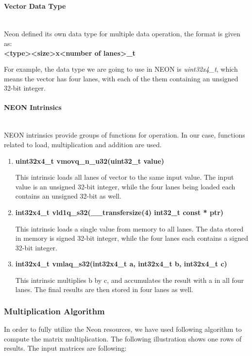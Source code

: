 \paragraph{Vector Data Type}
~\\
Neon defined its own data type\cite{DataType} for multiple data operation, the format is given as:
~\\ 
\textbf{ \textless type\textgreater \textless size\textgreater x\textless number of lanes\textgreater\_t}

For example, the data type we are going to use in NEON is \emph{uint32x4\_t}, 
which means the vector has four lanes, 
with each of the them containing an unsigned 32-bit integer. 

\paragraph{NEON Intrinsics}
~\\
NEON intrinsics \cite{Intrinsics} provide groups of functions for operation. 
In our case, functions related to load, multiplication and addition are used. 
\begin{enumerate}
\item \textbf{uint32x4\_t  vmovq\_n\_u32(uint32\_t value)}

This intrinsic loads all lanes of vector to the same input value. 
The input value is an unsigned 32-bit integer, 
while the four lanes being loaded each contains an unsigned 32-bit as well.


\item \textbf{int32x4\_t   vld1q\_s32(\_\_transfersize(4) int32\_t const * ptr)}

This intrinsic loads a single value from memory to all lanes.
The data stored in memory is signed 32-bit integer, 
while the four lanes each contains a signed 32-bit integer.

\item \textbf{int32x4\_t   vmlaq\_s32(int32x4\_t a, int32x4\_t b, int32x4\_t c)}

This intrinsic multiplies b by c, and accumulates the result with a in all four lanes.
The final results are then stored in four lanes as well.
\end{enumerate}

\subsubsection{Multiplication Algorithm}

In order to fully utilize the Neon resources, we have used following algorithm to compute the matrix multiplication. The following illustration shows one rows of results.
The input matrices are following:


